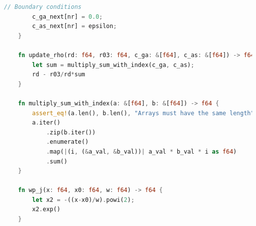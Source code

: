 \documentclass[14pt,oneside]{extarticle}
\begin{document}
\begin{lstlisting}[language=Rust]
        // Boundary conditions
        c_ga_next[nr] = 0.0;
        c_as_next[nr] = epsilon;
    }
    
    fn update_rho(rd: f64, r03: f64, c_ga: &[f64], c_as: &[f64]) -> f64 {
        let sum = multiply_sum_with_index(c_ga, c_as);
        rd - r03/rd*sum
    }
    
    fn multiply_sum_with_index(a: &[f64], b: &[f64]) -> f64 {
        assert_eq!(a.len(), b.len(), "Arrays must have the same length");
        a.iter()
            .zip(b.iter())
            .enumerate()
            .map(|(i, (&a_val, &b_val))| a_val * b_val * i as f64)
            .sum()
    }
    
    fn wp_j(x: f64, x0: f64, w: f64) -> f64 {
        let x2 = -((x-x0)/w).powi(2);
        x2.exp()
    }    
\end{lstlisting}
\end{document}
